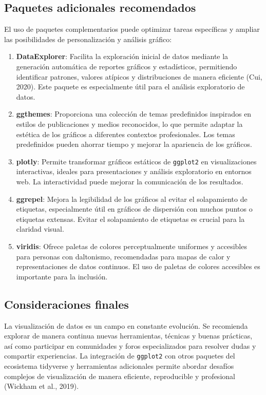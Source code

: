 \documentclass[
  spanish,
  a4paper,
  DIV=11,
  numbers=noendperiod,
  onepage,
  openany]{scrreprt}
\begin{document}
\subsection{Paquetes adicionales
recomendados}\label{paquetes-adicionales-recomendados}

El uso de paquetes complementarios puede optimizar tareas específicas y
ampliar las posibilidades de personalización y análisis gráfico:

\begin{enumerate}
\def\labelenumi{\arabic{enumi}.}
\item
  \textbf{DataExplorer}: Facilita la exploración inicial de datos
  mediante la generación automática de reportes gráficos y estadísticos,
  permitiendo identificar patrones, valores atípicos y distribuciones de
  manera eficiente (Cui, 2020). Este paquete es especialmente útil para
  el análisis exploratorio de datos.
\item
  \textbf{ggthemes}: Proporciona una colección de temas predefinidos
  inspirados en estilos de publicaciones y medios reconocidos, lo que
  permite adaptar la estética de los gráficos a diferentes contextos
  profesionales. Los temas predefinidos pueden ahorrar tiempo y mejorar
  la apariencia de los gráficos.
\item
  \textbf{plotly}: Permite transformar gráficos estáticos de
  \texttt{ggplot2} en visualizaciones interactivas, ideales para
  presentaciones y análisis exploratorio en entornos web. La
  interactividad puede mejorar la comunicación de los resultados.
\item
  \textbf{ggrepel}: Mejora la legibilidad de los gráficos al evitar el
  solapamiento de etiquetas, especialmente útil en gráficos de
  dispersión con muchos puntos o etiquetas extensas. Evitar el
  solapamiento de etiquetas es crucial para la claridad visual.
\item
  \textbf{viridis}: Ofrece paletas de colores perceptualmente uniformes
  y accesibles para personas con daltonismo, recomendadas para mapas de
  calor y representaciones de datos continuos. El uso de paletas de
  colores accesibles es importante para la inclusión.
\end{enumerate}

\subsection{Consideraciones finales}\label{consideraciones-finales}

La visualización de datos es un campo en constante evolución. Se
recomienda explorar de manera continua nuevas herramientas, técnicas y
buenas prácticas, así como participar en comunidades y foros
especializados para resolver dudas y compartir experiencias. La
integración de \texttt{ggplot2} con otros paquetes del ecosistema
tidyverse y herramientas adicionales permite abordar desafíos complejos
de visualización de manera eficiente, reproducible y profesional
(Wickham et al., 2019).
\end{document}
